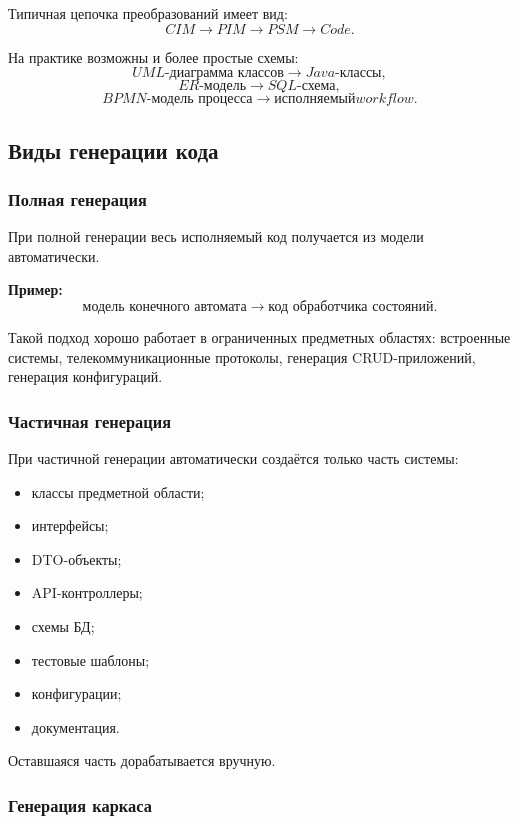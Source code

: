 \documentclass[12pt,a4paper]{article}
\begin{document}
Типичная цепочка преобразований имеет вид:
\[
    CIM \longrightarrow PIM \longrightarrow PSM \longrightarrow Code.
\]

На практике возможны и более простые схемы:
\[
    UML\text{-диаграмма классов} \longrightarrow Java\text{-классы},
\]
\[
    ER\text{-модель} \longrightarrow SQL\text{-схема},
\]
\[
    BPMN\text{-модель процесса} \longrightarrow исполняемый workflow.
\]

\subsection{Виды генерации кода}

\subsubsection{Полная генерация}

При полной генерации весь исполняемый код получается из модели автоматически.

\textbf{Пример:}
\[
    \text{модель конечного автомата} \longrightarrow \text{код обработчика состояний}.
\]

Такой подход хорошо работает в ограниченных предметных областях: встроенные системы, телекоммуникационные протоколы, генерация CRUD-приложений, генерация конфигураций.

\subsubsection{Частичная генерация}

При частичной генерации автоматически создаётся только часть системы:

\begin{itemize}
    \item классы предметной области;
    \item интерфейсы;
    \item DTO-объекты;
    \item API-контроллеры;
    \item схемы БД;
    \item тестовые шаблоны;
    \item конфигурации;
    \item документация.
\end{itemize}

Оставшаяся часть дорабатывается вручную.

\subsubsection{Генерация каркаса}
\end{document}

